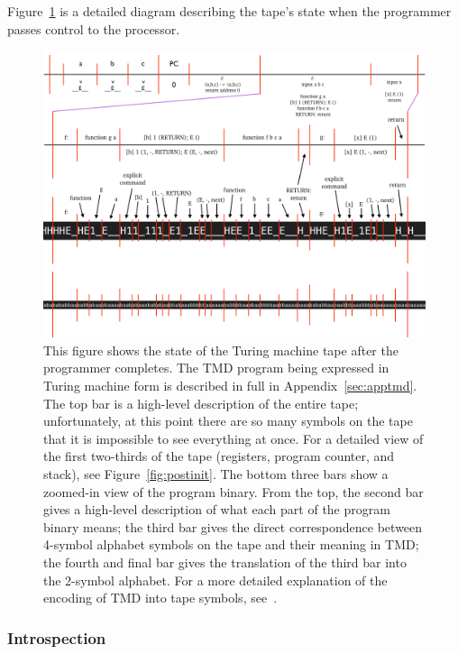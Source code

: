 \documentclass[11pt]{article}
\begin{document}
Figure~\ref{fig:postprog} is a detailed diagram describing the tape's state when the programmer passes control to the processor.

\begin{figure}
\begin{center}
\includegraphics[scale=0.42]{figs/postprog.png}
\caption{This figure shows the state of the Turing machine tape after the programmer completes. The TMD program being expressed in Turing machine form is described in full in Appendix~\ref{sec:apptmd}. The top bar is a high-level description of the entire tape; unfortunately, at this point there are so many symbols on the tape that it is impossible to see everything at once. For a detailed view of the first two-thirds of the tape (registers, program counter, and stack), see Figure~\ref{fig:postinit}. The bottom three bars show a zoomed-in view of the program binary. From the top, the second bar gives a high-level description of what each part of the program binary means; the third bar gives the direct correspondence between 4-symbol alphabet symbols on the tape and their meaning in TMD; the fourth and final bar gives the translation of the third bar into the 2-symbol alphabet. For a more detailed explanation of the encoding of TMD into tape symbols, see~\cite{ref:github}. \label{fig:postprog}}
\end{center}
\end{figure}

\subsubsection{Introspection}
\end{document}
